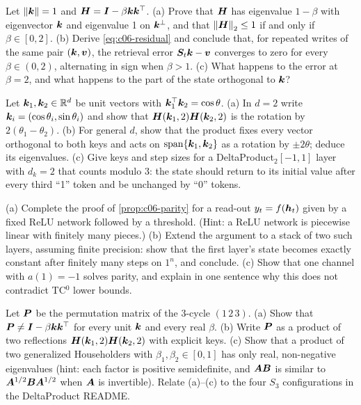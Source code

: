 \begin{exercise}\label{ex:c06-householder}
Let $\left\lVert \bm{k}\right\rVert=1$ and $\bm{H}=\bm{I}-\beta\bm{k}\bm{k}^{\top}$.
(a) Prove that $\bm{H}$ has eigenvalue $1-\beta$ with eigenvector $\bm{k}$ and eigenvalue 1 on
$\bm{k}^\perp$, and that $\left\lVert \bm{H}\right\rVert_2\le1$ if and only if $\beta\in[0,2]$.
(b) Derive \eqref{eq:c06-residual} and conclude that, for repeated writes of the same pair
$(\bm{k},\bm{v})$, the retrieval error $\bm{S}_t\bm{k}-\bm{v}$ converges to zero for every
$\beta\in(0,2)$, alternating in sign when $\beta>1$.
(c) What happens to the error at $\beta=2$, and what happens to the part of the state
orthogonal to $\bm{k}$?
\end{exercise}

\begin{exercise}\label{ex:c06-rotation}
Let $\bm{k}_1,\bm{k}_2\in\mathbb{R}^d$ be unit vectors with $\bm{k}_1^{\top}\bm{k}_2=\cos\theta$.
(a) In $d=2$ write $\bm{k}_i=(\cos\theta_i,\sin\theta_i)$ and show that
$\bm{H}(\bm{k}_1,2)\bm{H}(\bm{k}_2,2)$ is the rotation by $2(\theta_1-\theta_2)$.
(b) For general $d$, show that the product fixes every vector orthogonal to both keys and
acts on $\mathrm{span}\{\bm{k}_1,\bm{k}_2\}$ as a rotation by $\pm2\theta$; deduce its eigenvalues.
(c) Give keys and step sizes for a DeltaProduct$_2[-1,1]$ layer with $d_k=2$ that counts
modulo 3: the state should return to its initial value after every third ``1'' token and be
unchanged by ``0'' tokens.
\end{exercise}

\begin{exercise}\label{ex:c06-parity}
(a) Complete the proof of \cref{prop:c06-parity} for a read-out $y_t=f(\bm{h}_t)$ given by a fixed
ReLU network followed by a threshold. (Hint: a ReLU network is piecewise linear with finitely
many pieces.)
(b) Extend the argument to a stack of two such layers, assuming finite precision: show that
the first layer's state becomes exactly constant after finitely many steps on $1^n$, and
conclude.
(c) Show that one channel with $a(1)=-1$ solves parity, and explain in one sentence why this
does not contradict TC$^0$ lower bounds.
\end{exercise}

\begin{exercise}[Tracking $S_3$]\label{ex:c06-s3}
Let $\bm{P}$ be the permutation matrix of the 3-cycle $(1\,2\,3)$.
(a) Show that $\bm{P}\neq\bm{I}-\beta\bm{k}\bm{k}^{\top}$ for every unit $\bm{k}$ and every real $\beta$.
(b) Write $\bm{P}$ as a product of two reflections $\bm{H}(\bm{k}_1,2)\bm{H}(\bm{k}_2,2)$ with explicit keys.
(c) Show that a product of two generalized Householders with $\beta_1,\beta_2\in[0,1]$ has
only real, non-negative eigenvalues (hint: each factor is positive semidefinite, and $\bm{A}\bm{B}$
is similar to $\bm{A}^{1/2}\bm{B}\bm{A}^{1/2}$ when $\bm{A}$ is invertible). Relate (a)--(c) to the four
$S_3$ configurations in the DeltaProduct README.
\end{exercise}


